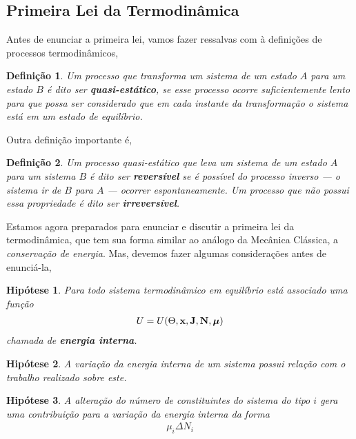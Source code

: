 \documentclass[twoside]{amsart}
\numberwithin{equation}{section}
\newtheorem{definicao}{Definição}[section]
\newtheorem{hipotese}{Hipótese}[section]
\begin{document}
\begin{refsection}
\subsection{Primeira Lei da Termodinâmica}

Antes de enunciar a primeira lei, vamos fazer ressalvas com à definições de processos 
termodinâmicos,

\begin{definicao}
    Um processo que transforma um sistema de um estado $A$ para um estado $B$ é dito ser 
    \textbf{quasi-estático}, se esse processo ocorre suficientemente lento para que possa 
    ser considerado que em cada instante da transformação o sistema está em um estado de 
    equilíbrio.
\end{definicao}

Outra definição importante é,

\begin{definicao}
    Um processo quasi-estático que leva um sistema de um estado $A$ para um sistema $B$ é 
    dito ser \textbf{reversível} se é possível do processo inverso --- o sistema ir de $B$ 
    para $A$ --- ocorrer espontaneamente. Um processo que não possui essa propriedade é dito 
    ser \textbf{irreversível}.
\end{definicao}

Estamos agora preparados para enunciar e discutir a primeira lei da termodinâmica, que tem sua forma similar ao análogo da Mecânica Clássica, a \emph{conservação de energia}. Mas, devemos fazer algumas considerações antes de enunciá-la,

\begin{hipotese}
    Para todo sistema termodinâmico em equilíbrio está associado uma função \begin{align}U=U\qty(\Theta,\vb x,\vb J,\vb N,\boldsymbol \mu)\end{align} chamada de \textbf{energia interna}.
\end{hipotese}

\begin{hipotese}
    A variação da energia interna de um sistema possui relação com o trabalho realizado sobre 
    este.
\end{hipotese}

\begin{hipotese}
    A alteração do número de constituintes do sistema do tipo $i$ gera uma contribuição para a 
    variação da energia interna da forma \begin{align}\mu_i\Delta N_i\end{align}
\end{hipotese}


\end{refsection}
\end{document}
